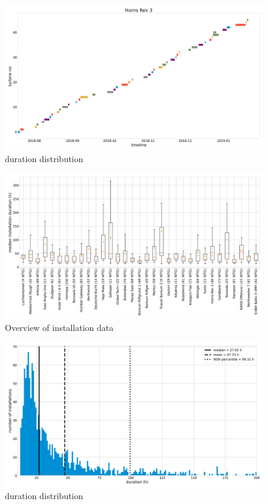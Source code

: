 \documentclass[wes, manuscript]{copernicus}
\begin{document}
\begin{figure}[h]
    \centering
    \includegraphics[width=\textwidth]{figures/gantt/Horns Rev 3.png}
    \caption{duration distribution}
    \label{fig:wind}
\end{figure}
\begin{figure}[h]
    \centering
    \includegraphics[width=\textwidth]{figures/installations-overview.png}
    \caption{Overview of installation data}
    \label{fig:overview}
\end{figure}

\begin{figure}[h]
    \centering
    \includegraphics[width=\textwidth]{figures/duration-distribution.png}
    \caption{duration distribution}
    \label{fig:distribution}
\end{figure}
\end{document}

